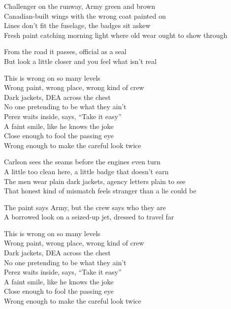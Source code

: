 \begin{lyrics}
Challenger on the runway, Army green and brown\\
Canadian-built wings with the wrong coat painted on\\
Lines don't fit the fuselage, the badges sit askew\\
Fresh paint catching morning light where old wear ought to show through

From the road it passes, official as a seal\\
But look a little closer and you feel what isn't real

This is wrong on so many levels\\
Wrong paint, wrong place, wrong kind of crew\\
Dark jackets, DEA across the chest\\
No one pretending to be what they ain't\\
Perez waits inside, says, “Take it easy”\\
A faint smile, like he knows the joke\\
Close enough to fool the passing eye\\
Wrong enough to make the careful look twice

Carlson sees the seams before the engines even turn\\
A little too clean here, a little badge that doesn't earn\\
The men wear plain dark jackets, agency letters plain to see\\
That honest kind of mismatch feels stranger than a lie could be

The paint says Army, but the crew says who they are\\
A borrowed look on a seized-up jet, dressed to travel far

This is wrong on so many levels\\
Wrong paint, wrong place, wrong kind of crew\\
Dark jackets, DEA across the chest\\
No one pretending to be what they ain't\\
Perez waits inside, says, “Take it easy”\\
A faint smile, like he knows the joke\\
Close enough to fool the passing eye\\
Wrong enough to make the careful look twice


\end{lyrics}
